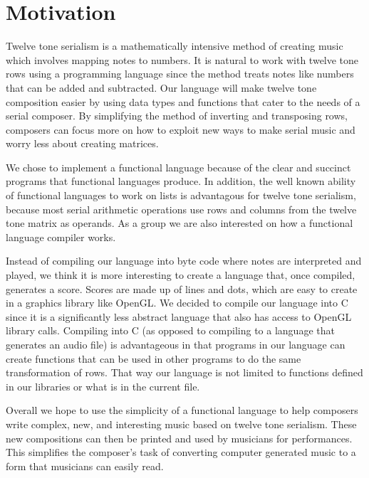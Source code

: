 \section{Motivation}

Twelve tone serialism is a mathematically intensive method of creating music which 
involves mapping notes to numbers. It is natural to work with twelve tone rows 
using a programming language since the method treats notes like numbers that 
can be added and subtracted. Our language will make twelve tone composition 
easier by using data types and functions that cater to the needs of a serial composer.
By simplifying the method of inverting and transposing rows, composers can focus 
more on how to exploit new ways to make serial music and worry less about 
creating matrices. 

We chose to implement a functional language because of the clear and 
succinct programs that functional languages produce. In addition, the well known ability
of functional languages to work on lists is advantagous for twelve tone serialism, because
most serial arithmetic operations use rows and columns from the twelve tone matrix as operands. 
As a group we are also interested on how a functional language compiler works. 

Instead of compiling our language into byte code where notes are interpreted and 
played, we think it is more interesting to create a language that, once compiled, 
generates a score. Scores are made up of lines and dots, which are easy to create in 
a graphics library like OpenGL. We decided to compile our language into C since it is a 
significantly less abstract language that also has access to OpenGL library calls. Compiling into C
 (as opposed to compiling to a language that generates an audio file) is advantageous in 
that programs in our language can create functions that can be used in other programs to do the same 
transformation of rows. That way our language is not limited to functions defined in 
our libraries or what is in the current file. 

Overall we hope to use the simplicity of a functional language to help composers write 
complex, new, and interesting music based on twelve tone serialism. These new compositions 
can then be printed and used by musicians for performances. This simplifies the composer's task of 
converting computer generated music to a form that musicians can easily read. 
